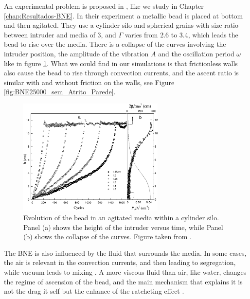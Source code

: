     An experimental problem is proposed in \cite{Inertia_in_the_Brazil_nut_problem}, like we study in Chapter \ref{chap:Resultados-BNE}. In their experiment a metallic bead is placed at bottom and then agitated. They use a cylinder silo and spherical grains with size ratio between intruder and media of 3, and $\Gamma$ varies from 2.6 to 3.4, which leads the bead to rise over the media. There is a collapse of the curves involving the intruder position, the amplitude of the vibration $A$ and the oscillation period $\omega$ like in figure \ref{fig:BNE_molinari}. What we could find in our simulations is that frictionless walls also cause the bead to rise through convection currents, and the ascent ratio is similar with and without friction on the walls, see Figure \ref{fig:BNE25000_sem_Atrito_Parede}.

\begin{figure}
    \centering
    \includegraphics[width=0.65\textwidth]{04-figuras/BNE_Molinari.png}
    \caption[Intruder height in an agitated media.]{Evolution of the bead in an agitated media within a cylinder silo. Panel (a) shows the height of the intruder versus time, while Panel (b) shows the collapse of the curves. Figure taken from \cite{Inertia_in_the_Brazil_nut_problem}.}
    \label{fig:BNE_molinari}
\end{figure}

    The BNE is also influenced by the fluid that surrounds the media. In some cases, the air is relevant in the convection currents, and then leading to segregation, while vacuum leads to mixing \cite{Brazil-Nut_effect_Size_separation_of_granular_particles, Inertia_in_the_Brazil_nut_problem}. A more viscous fluid than air, like water, changes the regime of ascension of the bead, and the main mechanism that explains it is not the drag it self but the enhance of the ratcheting effect \cite{The_water-enhance_Brazil_nut_effect}.

